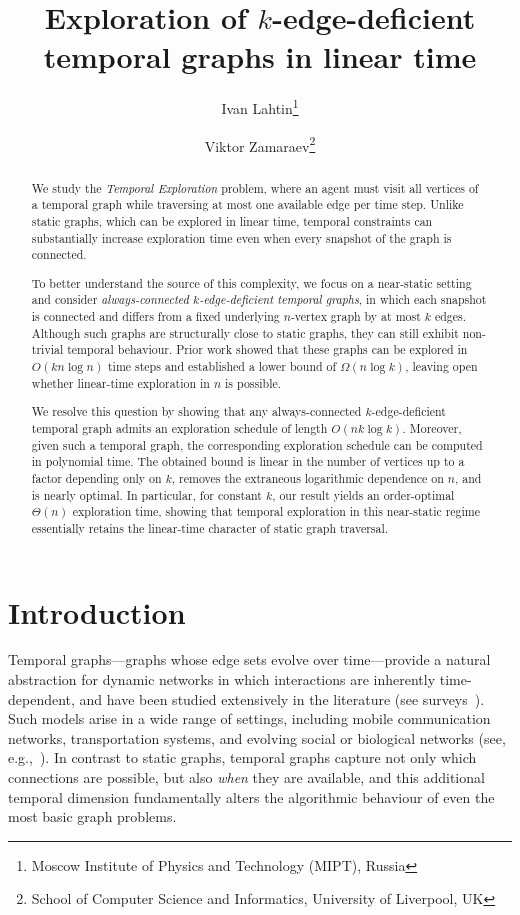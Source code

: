 \documentclass[a4paper,11pt]{article}
\title{Exploration of $k$-edge-deficient temporal graphs in linear time}
\author{ }
\author{Ivan Lahtin\thanks{Moscow Institute of Physics and Technology (MIPT), Russia} 
	\and
	Viktor Zamaraev\thanks{School of Computer Science and Informatics, University of Liverpool, UK}
	}
\date{}
\theoremstyle{definition}
\theoremstyle{remark}
\begin{document}
	
	\maketitle

    \begin{abstract}
        We study the \emph{Temporal Exploration} problem, where an agent must visit all vertices of a temporal graph while traversing at most one available edge per time step. Unlike static graphs, which can be explored in linear time, temporal constraints can substantially increase exploration time even when every snapshot of the graph is connected.

        To better understand the source of this complexity, we focus on a near-static setting and consider \emph{always-connected $k$-edge-deficient temporal graphs}, in which each snapshot is connected and differs from a fixed underlying $n$-vertex graph by at most $k$ edges. Although such graphs are structurally close to static graphs, they can still exhibit non-trivial temporal behaviour. Prior work showed that these graphs can be explored in $O(kn \log n)$ time steps and established a lower bound of $\Omega(n \log k)$, leaving open whether linear-time exploration in $n$ is possible.

        We resolve this question by showing that any always-connected $k$-edge-deficient temporal graph admits an exploration schedule of length $O(nk \log k)$. Moreover, given such a temporal graph, the corresponding exploration schedule can be computed in polynomial time.
        The obtained bound is linear in the number of vertices up to a factor depending only on $k$, removes the extraneous logarithmic dependence on $n$, and is nearly optimal. In particular, for constant $k$, our result yields an order-optimal $\Theta(n)$ exploration time, showing that temporal exploration in this near-static regime essentially retains the linear-time character of static graph traversal.
    \end{abstract}


	\newpage

	\section{Introduction}
	\label{sec:intro}

	Temporal graphs—graphs whose edge sets evolve over time—provide a natural abstraction for dynamic networks in which interactions are inherently time-dependent, and have been studied extensively in the literature (see surveys~\cite{CFQS12,MichailSurvey}). Such models arise in a wide range of settings, including mobile communication networks, transportation systems, and evolving social or biological networks (see, e.g.,~\cite{HS12,HS19}). In contrast to static graphs, temporal graphs capture not only which connections are possible, but also \emph{when} they are available, and this additional temporal dimension fundamentally alters the algorithmic behaviour of even the most basic graph problems.
	
\end{document}

